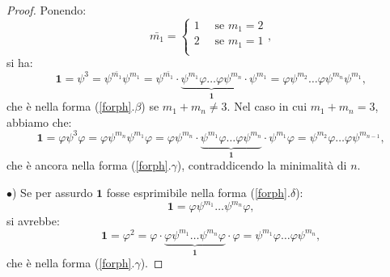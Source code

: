 \documentclass[a4paper,oneside,11pt]{book}
\theoremstyle{definition} \newtheorem{Def}{Definizione}
\theoremstyle{plain} \newtheorem{teo}{Teorema}
\theoremstyle{plain} \newtheorem{cor}[teo]{Corollario}
\theoremstyle{definition} \newtheorem{lem}[teo]{Lemma}
\theoremstyle{plain} \newtheorem{pro}[teo]{Proposizione}
\begin{document}
\begin{proof}
		Ponendo:
		\begin{equation*}
			\bar{m_1} = \left\{\begin{aligned}
				1 \quad \text{ se } m_1 = 2\\
				2 \quad \text{ se } m_1 = 1\\
			\end{aligned} \right. \text{,}
		\end{equation*}
		si ha:
		\begin{equation*}
			\mathbf{1} = \psi^3 = \psi^{\bar{m_1}} \psi^{m_1} = \psi^{\bar{m_1}} \cdot \underbrace{\psi^{m_1}\varphi \dots \varphi\psi^{m_n}}_\mathbf{1} \cdot \psi^{m_1} = \varphi\psi^{m_2} \dots \varphi\psi^{m_n}\psi^{m_1} \text{,}
		\end{equation*}
		che è nella forma (\ref{forph}.$\beta$) se $m_1 + m_n \neq 3$. Nel caso in cui $m_1 + m_n = 3$, abbiamo che:
		\begin{equation*}
			\mathbf{1} = \varphi\psi^3\varphi = \varphi\psi^{m_n}\psi^{m_1}\varphi = \varphi\psi^{m_n} \cdot \underbrace{\psi^{m_1}\varphi \dots \varphi\psi^{m_n}}_\mathbf{1} \cdot \psi^{m_1}\varphi = \psi^{m_2}\varphi \dots \varphi\psi^{m_{n-1}} \text{,}
		\end{equation*}
		che è ancora nella forma (\ref{forph}.$\gamma$), contraddicendo la minimalità di $n$. \lightning
		
		$\bullet$) Se per assurdo $\mathbf{1}$ fosse esprimibile nella forma (\ref{forph}.$\delta$):
		\begin{equation*}
			\mathbf{1} = \varphi \psi^{m_1} \dots \psi^{m_n} \varphi \text{,}
		\end{equation*}
		si avrebbe:
		\begin{equation*}
			\mathbf{1} = \varphi^2 = \varphi \cdot \underbrace{\varphi \psi^{m_1} \dots \psi^{m_n} \varphi}_\mathbf{1} \cdot \varphi = \psi^{m_1} \varphi \dots \varphi \psi^{m_n} \text{,}
		\end{equation*}
		che è nella forma (\ref{forph}.$\gamma$). \lightning
		
	\end{proof}
		
\end{document}

